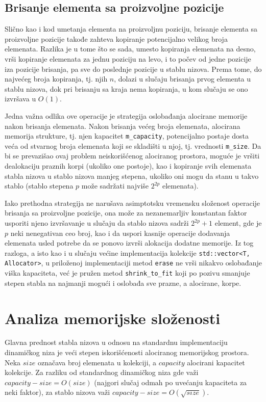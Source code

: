 \documentclass[a4paper]{article}
\begin{document}
\subsection{Brisanje elementa sa proizvoljne pozicije}

Slično kao i kod umetanja elementa na proizvoljnu poziciju, brisanje elementa sa proizvoljne pozicije takođe zahteva kopiranje potencijalno velikog broja elemenata. Razlika je u tome što se sada, umesto kopiranja elemenata na desno, vrši kopiranje elemenata za jednu poziciju na levo, i to počev od jedne pozicije iza pozicije brisanja, pa sve do poslednje pozicije u stablu nizova. Prema tome, do najvećeg broja kopiranja, tj. njih $n$, dolazi u slučaju brisanja prvog elementa u stablu nizova, dok pri brisanju sa kraja nema kopiranja, u kom slučaju se ono izvršava u $O(1)$.

Jedna važna odlika ove operacije je strategija oslobađanja alocirane memorije nakon brisanja elemenata. Nakon brisanja većeg broja elemenata, alocirana memorija strukture, tj. njen kapacitet \verb|m_capacity|, potencijalno postaje dosta veća od stvarnog broja elemenata koji se skladišti u njoj, tj. vrednosti \verb|m_size|. Da bi se prevazišao ovaj problem neiskorišćenog alociranog prostora, moguće je vršiti dealokaciju praznih korpi (ukoliko one postoje), kao i kopiranje svih elemenata stabla nizova u stablo nizova manjeg stepena, ukoliko oni mogu da stanu u takvo stablo (stablo stepena $p$ može sadržati najviše $2^{2p}$ elemenata).

Iako prethodna strategija ne narušava asimptotsku vremensku složenost operacije brisanja sa proizvoljne pozicije, ona može za nezanemarljiv konstantan faktor usporiti njeno izvršavanje u slučaju da stablo nizova sadrži $2^{2p} + 1$ element, gde je $p$ neki nenegativan ceo broj, kao i da uspori kasnije operacije dodavanja elemenata usled potrebe da se ponovo izvrši alokacija dodatne memorije. Iz tog razloga, a isto kao i u slučaju većine implementacija kolekcije \verb|std::vector<T, Allocator>|, u priloženoj implementaciji metod \verb|erase| ne vrši nikakvo oslobađanje viška kapaciteta, već je pružen metod \verb|shrink_to_fit| koji po pozivu smanjuje stepen stabla na najmanji mogući i oslobađa sve prazne, a alocirane, korpe.

\section{Analiza memorijske složenosti}

Glavna prednost stabla nizova u odnosu na standardnu implementaciju dinamičkog niza je veći stepen iskorišćenosti alociranog memorijskog prostora. Neka $size$ označava broj elemenata u kolekciji, a $capacity$ alocirani kapacitet kolekcije. Za razliku od standardnog dinamičkog niza gde važi $capacity - size = O(size)$ (najgori slučaj odmah po uvećanju kapaciteta za neki faktor), za stablo nizova važi $capacity - size = O(\sqrt{size})$.
\end{document}
